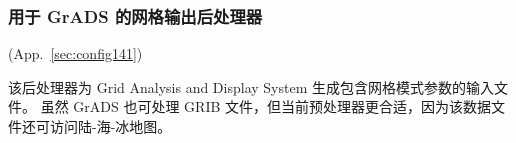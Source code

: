\vsssub
\subsubsection{用于 GrADS 的网格输出后处理器} \label{sec:gxoutf}
\vsssub

 (App.~\ref{sec:config141})

\vspace{\baselineskip} 
\noindent 
该后处理器为 Grid Analysis and Display System \citep[GrADS,][]{man:GrADS} 生成包含网格模式参数的输入文件。
虽然 GrADS 也可处理 GRIB 文件，但当前预处理器更合适，因为该数据文件还可访问陆-海-冰地图。

\pb
